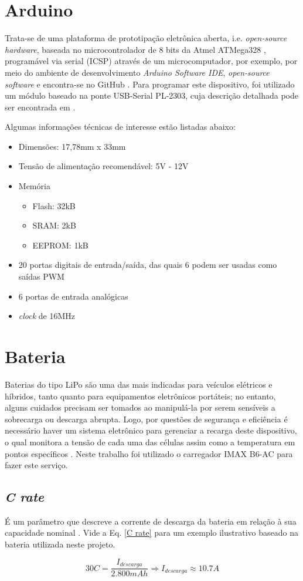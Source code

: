 \section{Arduino}
Trata-se de uma plataforma de prototipação eletrônica aberta, i.e. \textit{open-source hardware}, baseada no microcontrolador de 8 bits da Atmel 
ATMega328 \cite{ATMega}, programável via serial (ICSP) através de um microcomputador, por exemplo, por meio do ambiente de desenvolvimento 
\textit{Arduino Software IDE}, \textit{open-source software} e encontra-se no GitHub \cite{ArduSoft}.
Para programar este dispositivo, foi utilizado um módulo baseado na ponte USB-Serial PL-2303, cuja descrição detalhada pode ser encontrada em 
.

Algumas informações técnicas \cite{ArduInfo} de interesse estão listadas abaixo: 
\begin{itemize}
 \item Dimensões: 17,78mm x 33mm
 \item Tensão de alimentação recomendável: 5V - 12V
 \item Memória 
 \begin{itemize}
  \item Flash: 32kB 
  \item SRAM: 2kB
  \item EEPROM: 1kB
 \end{itemize}

 \item 20 portas digitais de entrada/saída, das quais 6 podem ser usadas como saídas PWM
 \item 6 portas de entrada analógicas
 \item \textit{clock} de 16MHz
\end{itemize}


\section{Bateria} %
Baterias do tipo LiPo são uma das mais indicadas para veículos elétricos e híbridos, tanto quanto para equipamentos eletrônicos portáteis; no 
entanto, alguns cuidados precisam ser tomados ao manipulá-la por serem sensíveis a sobrecarga ou descarga abrupta.
Logo, por questões de segurança e eficiência é necessário haver um sistema eletrônico para gerenciar a recarga deste dispositivo, o qual monitora a 
tensão de cada uma das células assim como a temperatura em pontos específicos \cite{battery}.
Neste trabalho foi utilizado o carregador IMAX B6-AC para fazer este serviço.
\subsection{\textit{C rate}}
É um parâmetro que descreve a corrente de descarga da bateria em relação à sua capacidade nominal \cite{bateria}.
Vide a Eq. \ref{C rate} para um exemplo ilustrativo baseado na bateria utilizada neste projeto.

\begin{equation}
 \label{C rate}
 30 C = \frac{ I_{descarga} }{ 2.800 mAh} \Rightarrow I_{descarga} \approx 10.7A
\end{equation}
